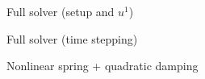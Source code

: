 \begin{frame}[fragile]{Full solver (setup and $u^1$)}
  
\end{frame}

\begin{frame}[fragile]{Full solver (time stepping)}
  
\end{frame}

\begin{frame}[fragile]{Nonlinear spring + quadratic damping}
  
\end{frame}
